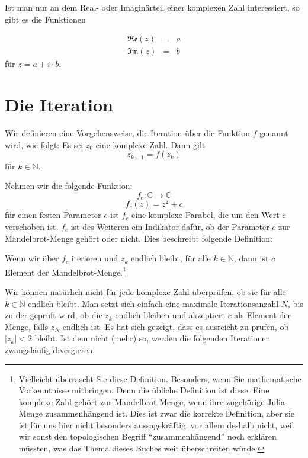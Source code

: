 Ist man nur an dem Real- oder Imaginärteil einer komplexen Zahl interessiert, so gibt es die Funktionen

\begin{eqnarray}
\mathfrak{Re}(z) &=& a \\
\mathfrak{Im}(z) &=& b
\end{eqnarray}
für $z=a+i\cdot b$.

\section{Die Iteration}
\begin{definition}
Wir definieren eine Vorgehensweise, die Iteration über die Funktion $f$ genannt wird, wie folgt: Es sei $z_0$ eine komplexe Zahl. Dann gilt
\begin{equation}
z_{k+1} = f(z_k)
\end{equation}
für $k\in \mathbb{N}$.
\end{definition}

Nehmen wir die folgende Funktion:
\begin{equation*}
f_c : \mathbb{C} \longrightarrow \mathbb{C}
\end{equation*}
\begin{equation}
f_c(z) = z^2+c
\end{equation}
für einen festen Parameter $c$ ist $f_c$ eine komplexe Parabel, die um den Wert $c$ verschoben ist. $f_c$ ist des Weiteren ein Indikator dafür, ob der Parameter $c$ zur Mandelbrot-Menge gehört oder nicht. Dies beschreibt folgende Definition:

\begin{definition}
Wenn wir über $f_c$ iterieren und $z_k$ endlich bleibt, für alle $k\in \mathbb{N}$, dann ist $c$ Element der Mandelbrot-Menge.\footnote{Vielleicht überrascht Sie diese Definition. Besonders, wenn Sie mathematische Vorkenntnisse mitbringen. Denn die übliche Definition ist diese: Eine komplexe Zahl gehört zur Mandelbrot-Menge, wenn ihre zugehörige Julia-Menge zusammenhängend ist. Dies ist zwar die korrekte Definition, aber sie ist für uns hier nicht besonders aussagekräftig, vor allem deshalb nicht, weil wir sonst den topologischen Begriff "`zusammenhängend"' noch erklären müssten, was das Thema dieses Buches weit überschreiten würde.}
\end{definition}

Wir können natürlich nicht für jede komplexe Zahl überprüfen, ob sie für alle $k\in \mathbb{N}$ endlich bleibt. Man setzt sich einfach eine maximale Iterationsanzahl $N$, bis zu der geprüft wird, ob die $z_k$ endlich bleiben und akzeptiert $c$ als Element der Menge, falls $z_N$ endlich ist. Es hat sich gezeigt, dass es ausreicht zu prüfen, ob $\vert z_k\vert <2$ bleibt. Ist dem nicht (mehr) so, werden die folgenden Iterationen zwangsläufig divergieren. 

